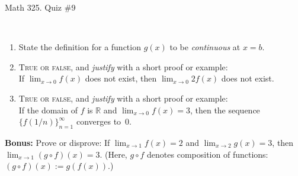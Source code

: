 \documentclass[12pt]{amsart}
\newcommand{\R}{\mathbb{R}}
\begin{document}
	
	\thispagestyle{empty}
	
	\begin{center}
		\Large{Math 325. Quiz \#9 }\\

	\end{center}
	
	\
	
\begin{enumerate}
		\item State the definition for a function $g(x)$ to be \emph{continuous} at $x=b$. 
		\vfill
		\vfill



\item  \textsc{True or false}, and \emph{justify} with a short proof or example:\\
 If $\displaystyle \lim_{x\to 0} f(x)$ does not exist, then $\displaystyle \lim_{x\to 0} 2 f(x)$ does not exist.
	
	\vfill	\vfill\vfill
	

	
	
\item  \textsc{True or false}, and \emph{justify} with a short proof or example:\\
If the domain of $f$ is $\R$ and ${\displaystyle\lim_{x\to 0} f(x) = 3}$, then the sequence $\{  f(1/n)\}_{n=1}^\infty$ converges to~$0$.

\vfill\vfill\vfill





\end{enumerate}




\newpage

\noindent \textbf{Bonus:} Prove or disprove: If $\lim_{x\to 1} f(x) = 2$ and $\lim_{x\to 2} g(x) = 3$, then $\lim_{x\to 1} (g \circ f)(x) = 3$. (Here, $g \circ f$ denotes composition of functions: $(g\circ f)(x) := g(f(x))$.)
	
	
\end{document}
